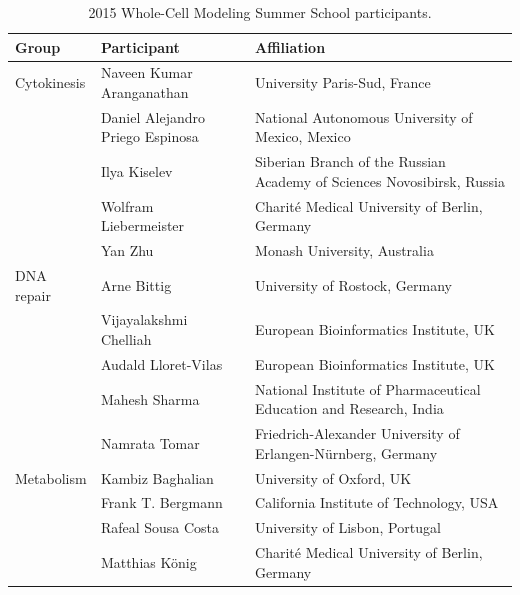 \documentclass[journal,transmag]{IEEEtran}
\begin{document}

\clearpage
\setcounter{table}{0}
\renewcommand{\thetable}{S\Roman{table}}

\begin{table}[ht!]
\caption{2015 Whole-Cell Modeling Summer School participants.}
\begin{tabularx}{\textwidth}{l||l||X}\hline
\bfseries Group           & \bfseries Participant            & \bfseries Affiliation\\\hline\hline
Cytokinesis               & Naveen Kumar Aranganathan        & University Paris-Sud, France\\
                          & Daniel Alejandro Priego Espinosa & National Autonomous University of Mexico, Mexico\\
                          & Ilya Kiselev                     & Siberian Branch of the Russian Academy of Sciences Novosibirsk, Russia\\
                          & Wolfram Liebermeister            & Charit\'e Medical University of Berlin, Germany\\
                          & Yan Zhu                          & Monash University, Australia\\\hline
DNA repair                & Arne Bittig                      & University of Rostock, Germany\\
                          & Vijayalakshmi Chelliah           & European Bioinformatics Institute, UK\\
                          & Audald Lloret-Vilas              & European Bioinformatics Institute, UK\\
                          & Mahesh Sharma                    & National Institute of Pharmaceutical Education and Research, India\\
                          & Namrata Tomar                    & Friedrich-Alexander University of Erlangen-N\"urnberg, Germany\\\hline
Metabolism                & Kambiz Baghalian                 & University of Oxford, UK\\
                          & Frank T. Bergmann                & California Institute of Technology, USA\\
                          & Rafeal Sousa Costa               & University of Lisbon, Portugal\\
                          & Matthias K\"onig                 & Charit\'e Medical University of Berlin, Germany\\

\end{tabularx}
\end{table}
\end{document}
